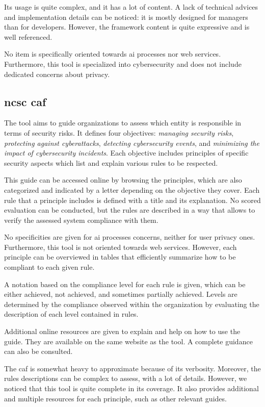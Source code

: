Its usage is quite complex, and it has a lot of content. A lack of technical advices and implementation details can be noticed: it is mostly designed for managers than for developers. However, the \gls{framework} content is quite expressive and is well referenced.

No item is specifically oriented towards \gls{ai} processes nor web services. Furthermore, this tool is specialized into cybersecurity and does not include dedicated concerns about privacy.

\subsection{\gls*{ncsc} \acrlong*{caf}}

The  tool aims to guide organizations to assess which entity is responsible in terms of security risks. It defines four objectives: \textit{managing security risks}, \textit{protecting against cyberattacks}, \textit{detecting cybersecurity events}, and \textit{minimizing the impact of cybersecurity incidents}. Each objective includes principles of specific security aspects which list and explain various rules to be respected.

This guide can be accessed online by browsing the principles, which are also categorized and indicated by a letter depending on the objective they cover. Each rule that a principle includes is defined with a title and its explanation. No scored evaluation can be conducted, but the rules are described in a way that allows to verify the assessed system compliance with them.

No specificities are given for \gls{ai} processes concerns, neither for user privacy ones. Furthermore, this tool is not oriented towards web services. However, each principle can be overviewed in tables that efficiently summarize how to be compliant to each given rule.

A notation based on the compliance level for each rule is given, which can be either achieved, not achieved, and sometimes partially achieved. Levels are determined by the compliance observed within the organization by evaluating the description of each level contained in rules.

Additional online resources are given to explain and help on how to use the guide. They are available on the same website as the tool. A complete guidance can also be consulted.

The \gls{caf} is somewhat heavy to approximate because of its verbosity. Moreover, the rules descriptions can be complex to assess, with a lot of details. However, we noticed that this tool is quite complete in its coverage. It also provides additional and multiple resources for each principle, such as other relevant guides.

